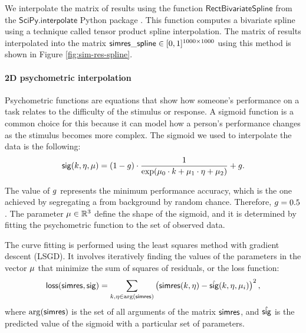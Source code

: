 We interpolate the matrix of results using the function $\mathsf{RectBivariateSpline}$ from the $\mathsf{SciPy.interpolate}$ Python package \cite{SciPy:RectBivariateSpline}. This function computes a bivariate spline using a technique called tensor product spline interpolation. 
The matrix of results interpolated into the matrix $\mathsf{simres\_spline} \in [0, 1]^{1000 \times 1000}$ using this method is shown in Figure \ref{fig:sim-res-spline}.

\paragraph{2D psychometric interpolation}

Psychometric functions are equations that show how someone's performance on a task relates to the difficulty of the stimulus or response. A sigmoid function is a common choice for this because it can model how a person's performance changes as the stimulus becomes more complex. The sigmoid we used to interpolate the data is the following:
\begin{equation}
    \mathsf{sig}(k, \eta, \mu) = (1 - g) \cdot \frac{1}{
    \exp(\mu_0 \cdot k + \mu_1 \cdot \eta + \mu_2)
    } + g.
\end{equation}

The value of $g$ represents the minimum performance accuracy, which is the one achieved by segregating a \stimfig{} from background by random chance. Therefore, $g = 0.5$.
The parameter $\mu \in \mathbb{R}^3$ define the shape of the sigmoid, and it is determined by fitting the psychometric function to the set of observed data. 

The curve fitting is performed using the least squares method with gradient descent (LSGD). It involves iteratively finding the values of the parameters in the vector $\mu$ that minimize the sum of squares of residuals, or the loss function:
\begin{equation}
    \mathsf{loss}(\mathsf{simres}, \mathsf{sig}) = \sum_{k, \eta \in \arg (\mathsf{simres})} 
    \left(
        \mathsf{simres}(k, \eta) - \hat{\mathsf{sig}}(k, \eta, \mu_i)
    \right)^2,
\end{equation}
where $\arg (\mathsf{simres})$ is the set of all arguments of the matrix $\mathsf{simres}$, and $\hat{\mathsf{sig}}$ is the predicted value of the sigmoid with a particular set of parameters.

